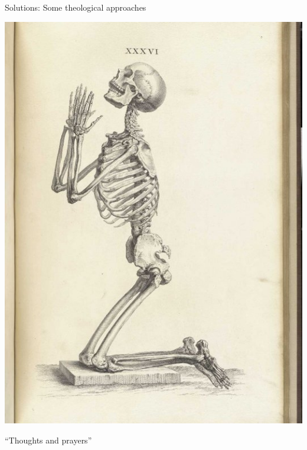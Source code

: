 \documentclass{hertieteaching}
\begin{document}
%
%
%
%

\nocite{Mikhaylov.etal2011}

\begin{frame}{Solutions: Some theological approaches}

\pause

\centerline{\includegraphics[scale=0.3]{pictures/praying-skeleton}}

\centerline{``Thoughts and prayers''}

\end{frame}
\end{document}
